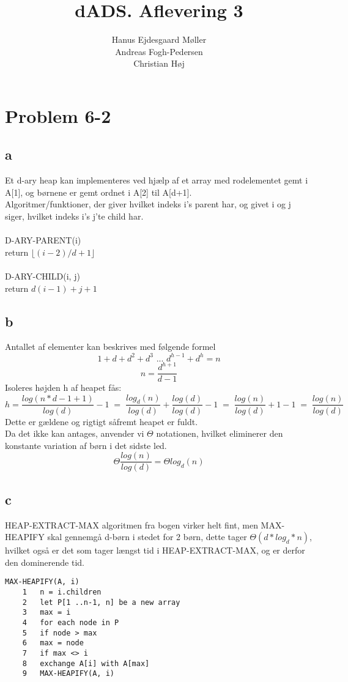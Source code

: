 \documentclass{article}
\title{dADS. Aflevering 3}
\author{
	Hanus Ejdesgaard Møller \\
	Andreas Fogh-Pedersen \\
	Christian Høj
}
\begin{document}
\maketitle
\section{Problem 6-2}
\subsection{a}
    Et d-ary heap kan implementeres ved hjælp af et array med rodelementet gemt i A[1], og børnene er gemt ordnet i A[2] til A[d+1].\\
    Algoritmer/funktioner, der giver hvilket indeks i's parent har, og givet i og j siger, hvilket indeks i's j'te child har.\\
\\
D-ARY-PARENT(i)\\
return $ \lfloor (i-2)/d+1 \rfloor $\\
\\
D-ARY-CHILD(i, j)\\
return $ d(i - 1) + j + 1 $\\

\subsection{b}
    Antallet af elementer kan beskrives med følgende formel
    \[ 1+d+d^2+d^3 \text{ ... } d^{h-1}+d^h=n \]
    \[ n= \frac{d^{h+1}}{d-1} \]
        Isoleres højden h af heapet fås:
    \[ h= \frac{log(n*d-1+1)}{log(d)}-1 \; = \; \frac{log_d(n)}{log(d)}+\frac{log(d)}{log(d)}-1 \; = \; \frac{log(n)}{log(d)}+1 -1 \; = \; \frac{log(n)}{log(d)} \]
    Dette er gældene og rigtigt såfremt heapet er fuldt.\\
    Da det ikke kan antages, anvender vi $ \Theta $ notationen, hvilket eliminerer den konstante variation af børn i det sidste led.  \[ \Theta \frac{log(n)}{log(d)}= \Theta log_d(n) \]
    
\subsection{c}
HEAP-EXTRACT-MAX algoritmen fra bogen virker helt fint, men MAX-HEAPIFY skal gennemgå d-børn i stedet for 2 børn, dette tager $ \Theta(d*log_d*n) $, hvilket også er det som tager længst tid i HEAP-EXTRACT-MAX, og er derfor den dominerende tid.\\
    \begin{verbatim}
MAX-HEAPIFY(A, i)
    1   n = i.children
    2   let P[1 ..n-1, n] be a new array
    3   max = i
    4   for each node in P
    5   if node > max
    6   max = node
    7   if max <> i
    8   exchange A[i] with A[max]
    9   MAX-HEAPIFY(A, i)
    \end{verbatim}
    
\end{document}
